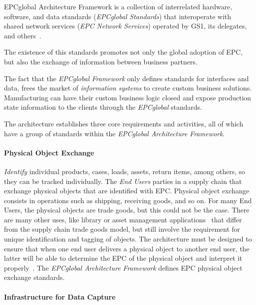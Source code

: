 EPCglobal Architecture Framework is a collection of interrelated hardware, software, and data standards (\emph{EPCglobal Standards}) that interoperate with shared network services (\emph{EPC Network Services}) operated by GS1, its delegates, and others~\cite{Architecture6framework20140414Pdf}.

The existence of this standards promotes not only the global adoption of \gls{EPC}, but also the exchange of information between business partners. 

The fact that the \emph{EPCglobal Framework} only defines standards for interfaces and data, frees the market of \emph{information systems} to create custom business solutions. Manufacturing can have their custom business logic closed and expose production state information to the clients through the \emph{EPCglobal} standards.

The architecture establishes three core requirements and activities, all of which have a group of standards within the \emph{EPCglobal Architecture Framework}.

\paragraph{Physical Object Exchange} 

\emph{Identify} individual products, cases, loads, assets, return items, among others, so they can be tracked individually.
The \emph{End Users} parties in a supply chain that exchange physical objects that are identified with \gls{EPC}.
Physical object exchange consists in operations such as shipping, receiving goods, and so on.
For many End Users, the physical objects are trade goods, but this could not be the case.
There are many other uses, like library or asset management applications~\cite{dong-yingliDesignInternetThings2016} that differ from the \gls{supply chain} trade goods model, but still involve the requirement for unique identification and tagging of objects. 
The architecture must be designed to ensure that when one end user delivers a physical object to another end user, the latter will be able to determine the \gls{EPC} of the physical object and interpret it properly~\cite{Architecture6framework20140414Pdf}.
The \emph{EPCglobal Architecture Framework} defines \gls{EPC} physical object exchange standards.

\paragraph{Infrastructure for Data Capture} 

